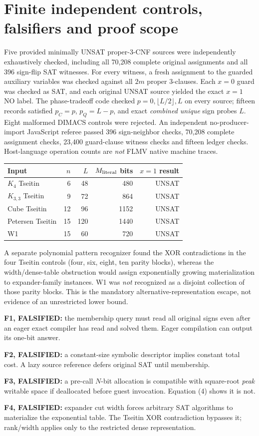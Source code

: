 \documentclass[11pt]{article}
\begin{document}
\section{Finite independent controls, falsifiers and proof scope}
Five provided minimally UNSAT proper-3-CNF sources were independently exhaustively checked, including all 70,208 complete original assignments and all 396 sign-flip SAT witnesses. For every witness, a fresh assignment to the guarded auxiliary variables was checked against all $2m$ proper 3-clauses. Each $x=0$ guard was checked as SAT, and each original UNSAT source yielded the exact $x=1$ NO label. The phase-tradeoff code checked $p=0,\lfloor L/2\rfloor,L$ on every source; fifteen records satisfied $p_C=p$, $p_Q=L-p$, and exact \emph{combined unique} sign probes $L$. Eight malformed DIMACS controls were rejected. An independent no-producer-import JavaScript referee passed 396 sign-neighbor checks, 70,208 complete assignment checks, 23,400 guard-clause witness checks and fifteen ledger checks. Host-language operation counts are \emph{not} FLMV native machine traces.
\begin{center}
\begin{tabular}{lrrrr}
\toprule
Input & $n$ & $L$ & $M_{\rm literal}$ bits & $x=1$ result\\\midrule
$K_4$ Tseitin &6&48&480&UNSAT\\
$K_{3,3}$ Tseitin &9&72&864&UNSAT\\
Cube Tseitin &12&96&1152&UNSAT\\
Petersen Tseitin &15&120&1440&UNSAT\\
W1 &15&60&720&UNSAT\\
\bottomrule
\end{tabular}
\end{center}
\noindent A separate polynomial pattern recognizer found the XOR contradictions in the four Tseitin controls (four, six, eight, ten parity blocks), whereas the width/dense-table obstruction would assign exponentially growing materialization to expander-family instances. W1 was \emph{not} recognized as a disjoint collection of those parity blocks. This is the mandatory alternative-representation escape, not evidence of an unrestricted lower bound.

\noindent\textbf{F1, FALSIFIED:} the membership query must read all original signs even after an eager exact compiler has read and solved them. Eager compilation can output its one-bit answer.\par
\noindent\textbf{F2, FALSIFIED:} a constant-size symbolic descriptor implies constant total cost. A lazy source reference defers original SAT until membership.\par
\noindent\textbf{F3, FALSIFIED:} a pre-call $N$-bit allocation is compatible with square-root \emph{peak} writable space if deallocated before guest invocation. Equation (4) shows it is not.\par
\noindent\textbf{F4, FALSIFIED:} expander cut width forces arbitrary SAT algorithms to materialize the exponential table. The Tseitin XOR contradiction bypasses it; rank/width applies only to the restricted dense representation.\par
\end{document}
